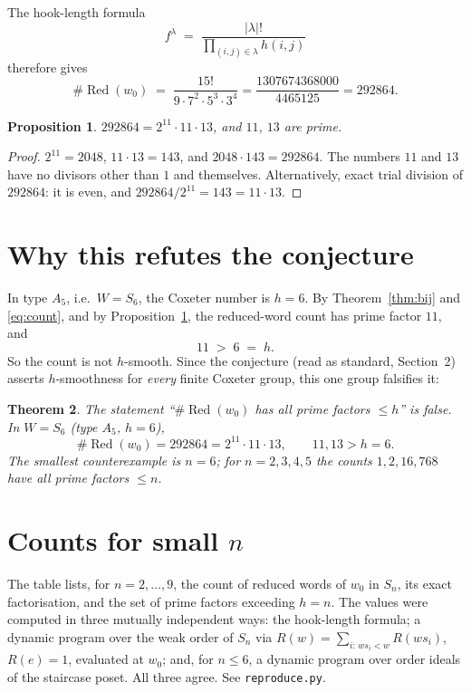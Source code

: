 \documentclass[11pt]{article}
\newtheorem{theorem}{Theorem}
\newtheorem{proposition}[theorem]{Proposition}
\theoremstyle{definition}
\theoremstyle{remark}
\newcommand{\Red}{\operatorname{Red}}
\begin{document}
The hook-length formula
\[
f^{\lambda} \;=\; \frac{|\lambda|!}{\displaystyle\prod_{(i,j)\in\lambda} h(i,j)}
\]
therefore gives
\begin{equation}\label{eq:count}
\#\Red(w_0) \;=\; \frac{15!}{9\cdot 7^2\cdot 5^3\cdot 3^4}
= \frac{1307674368000}{4465125}
= 292864 .
\end{equation}

\begin{proposition}\label{prop:factor}
$292864 = 2^{11}\cdot 11\cdot 13$, and $11$, $13$ are prime.
\end{proposition}

\begin{proof}
$2^{11} = 2048$, $11\cdot 13 = 143$, and $2048\cdot 143 = 292864$. The
numbers $11$ and $13$ have no divisors other than $1$ and themselves.
Alternatively, exact trial division of $292864$: it is even, and
$292864/2^{11} = 143 = 11\cdot 13$.
\end{proof}

\section{Why this refutes the conjecture}\label{sec:refute}

In type $A_5$, i.e.\ $W = S_6$, the Coxeter number is $h = 6$. By
Theorem~\ref{thm:bij} and \eqref{eq:count}, and by
Proposition~\ref{prop:factor}, the reduced-word count has prime factor $11$,
and
\[
11 \;>\; 6 \;=\; h .
\]
So the count is not $h$-smooth. Since the conjecture (read as standard,
Section~2) asserts $h$-smoothness for \emph{every} finite Coxeter group, this
one group falsifies it:

\begin{theorem}\label{thm:false}
The statement ``$\#\Red(w_0)$ has all prime factors $\le h$'' is false. In
$W = S_6$ (type $A_5$, $h = 6$),
\[
\#\Red(w_0) = 292864 = 2^{11}\cdot 11\cdot 13,
\qquad 11,13 > h = 6 .
\]
The smallest counterexample is $n = 6$; for $n = 2,3,4,5$ the counts
$1, 2, 16, 768$ have all prime factors $\le n$.
\end{theorem}

\section{Counts for small $n$}

The table lists, for $n = 2,\dots,9$, the count of reduced words of $w_0$ in
$S_n$, its exact factorisation, and the set of prime factors exceeding
$h = n$. The values were computed in three mutually independent ways: the
hook-length formula; a dynamic program over the weak order of $S_n$ via
$R(w) = \sum_{i:\,ws_i<w} R(ws_i)$, $R(e) = 1$, evaluated at $w_0$; and, for
$n\le 6$, a dynamic program over order ideals of the staircase poset. All
three agree. See \texttt{reproduce.py}.
\end{document}
